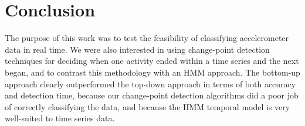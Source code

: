 \chapter{Conclusion}
The purpose of this work was to test the feasibility of classifying 
accelerometer data in real time. We were also interested in using change-point
detection techniques for deciding when one activity ended within a time series
and the next began, and to contrast this methodology with an HMM approach.
The bottom-up approach clearly outperformed the top-down approach in terms
of both accuracy and detection time, because our change-point detection
algorithms did a poor job of correctly classifying the data, and because the
HMM temporal model is very well-suited to time series data.
